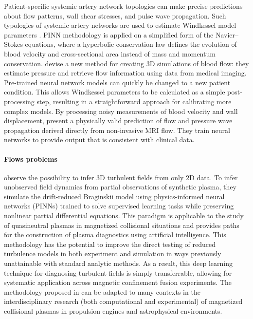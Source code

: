\documentclass[pdflatex,sn-basic]{sn-jnl}%
\theoremstyle{thmstyleone}%
\theoremstyle{thmstyletwo}%
\theoremstyle{thmstylethree}%
\begin{document}
Patient-specific systemic artery network topologies can make precise predictions about flow patterns, wall shear stresses, and pulse wave propagation. 
Such typologies of systemic artery networks are used to estimate Windkessel model parameters \citep{Kis2020_MachineLearningCardiovascular_YanKYH}.  
PINN methodology is applied on a simplified form of the  Navier–Stokes equations, where a hyperbolic conservation law defines the evolution of blood velocity and cross-sectional area instead of mass and momentum conservation. 
\cite{Kis2020_MachineLearningCardiovascular_YanKYH} devise a new method for creating 3D simulations of blood flow:
they estimate pressure and retrieve flow information using data from medical imaging.
Pre-trained neural network models can quickly be changed to a new patient condition.
This allows Windkessel parameters to be calculated as a simple post-processing step, resulting in a straightforward approach for calibrating more complex models.
%
By processing noisy measurements of blood velocity and wall displacement, \cite{Kis2020_MachineLearningCardiovascular_YanKYH}  present a physically valid prediction of flow and pressure wave propagation derived directly from non-invasive MRI flow.
They train neural networks to provide output that is consistent with clinical data.

\paragraph{Flows problems} %
\cite{Mat2021_UncoveringTurbulentPlasma_FraMFH} observe the possibility to infer 3D turbulent fields from only 2D data.
To infer unobserved field dynamics from partial observations of synthetic plasma,
they
simulate the drift-reduced Braginskii model using physics-informed neural networks (PINNs) trained to solve supervised learning tasks while preserving nonlinear partial differential equations.
This paradigm is applicable to the study of quasineutral plasmas in magnetized collisional situations and provides paths for the construction of plasma diagnostics using artificial intelligence.
This methodology has the potential to improve the direct testing of reduced turbulence models in both experiment and simulation in ways previously unattainable with standard analytic methods. 
%
As a result, this deep learning technique for diagnosing turbulent fields is simply transferrable, allowing for systematic application across magnetic confinement fusion experiments.
The methodology proposed in \cite{Mat2021_UncoveringTurbulentPlasma_FraMFH} can be adapted to many contexts in the interdisciplinary research (both computational and experimental) of magnetized collisional plasmas in propulsion engines and astrophysical environments.
\end{document}
